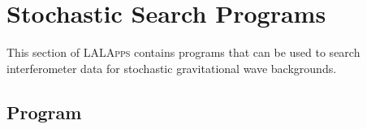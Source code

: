 
\chapter{Stochastic Search Programs}
\label{chapter:stochastic}

This section of \textsc{LALApps} contains programs that can be used to
search interferometer data for stochastic gravitational wave
backgrounds.

\clearpage


\clearpage
\section{Program }
\label{program:lalapps-stochastic-pipe}

